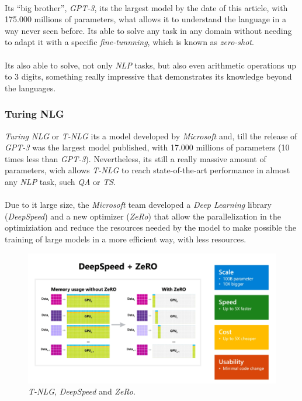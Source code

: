 \paragraph{}
Its ``big brother'', \emph{GPT-3}, its the largest model by the date of this article, with 175.000 millions of parameters, what allows it to understand the language in a way never seen before. Its able to solve any task in any domain without needing to adapt it with a specific \emph{fine-tunnning}, which is known as \emph{zero-shot}.
\paragraph{}
Its also able to solve, not only \emph{NLP} tasks, but also even arithmetic operations up to 3 digits, something really impressive that demonstrates its knowledge beyond the languages.
\subsubsection{Turing NLG}
\noindent \emph{Turing NLG} or \emph{T-NLG}\cite{Rosset2020} its a model developed by \emph{Microsoft} and, till the release of \emph{GPT-3} was the largest model published, with 17.000 millions of parameters (10 times less than \emph{GPT-3}). Nevertheless, its still a really massive amount of parameters, wich allows \emph{T-NLG} to reach state-of-the-art performance in almost any \emph{NLP} task, such \emph{QA} or \emph{TS}.
\paragraph{}
Due to it large size, the \emph{Microsoft} team developed a \emph{Deep Learning} library (\emph{DeepSpeed}) and a new optimizer (\emph{ZeRo}) that allow the parallelization in the optimiziation and reduce the resources needed by the model to make possible the training of large models in a more efficient way, with less resources.
\begin{figure}[h!]
	\centering
	\includegraphics[scale=0.35]{images/tnlg}
	\caption{\emph{T-NLG}, \emph{DeepSpeed} and \emph{ZeRo}.}
	\label{fig:tnlg}
\end{figure}
